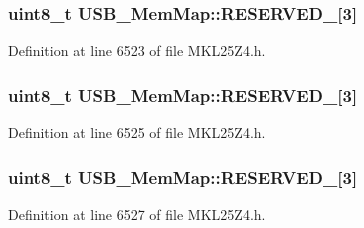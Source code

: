 \subsubsection[{\texorpdfstring{R\+E\+S\+E\+R\+V\+E\+D\+\_\+11}{RESERVED_11}}]{\setlength{\rightskip}{0pt plus 5cm}uint8\+\_\+t U\+S\+B\+\_\+\+Mem\+Map\+::\+R\+E\+S\+E\+R\+V\+E\+D\+\_\mbox{[}3\mbox{]}}\hypertarget{struct_u_s_b___mem_map_a60b8bb28c42b316a1f9bf655e900a39e}{}\label{struct_u_s_b___mem_map_a60b8bb28c42b316a1f9bf655e900a39e}


Definition at line 6523 of file M\+K\+L25\+Z4.\+h.

\subsubsection[{\texorpdfstring{R\+E\+S\+E\+R\+V\+E\+D\+\_\+12}{RESERVED_12}}]{\setlength{\rightskip}{0pt plus 5cm}uint8\+\_\+t U\+S\+B\+\_\+\+Mem\+Map\+::\+R\+E\+S\+E\+R\+V\+E\+D\+\_\mbox{[}3\mbox{]}}\hypertarget{struct_u_s_b___mem_map_a2c373821485abf12490a7676e60615ad}{}\label{struct_u_s_b___mem_map_a2c373821485abf12490a7676e60615ad}


Definition at line 6525 of file M\+K\+L25\+Z4.\+h.

\subsubsection[{\texorpdfstring{R\+E\+S\+E\+R\+V\+E\+D\+\_\+13}{RESERVED_13}}]{\setlength{\rightskip}{0pt plus 5cm}uint8\+\_\+t U\+S\+B\+\_\+\+Mem\+Map\+::\+R\+E\+S\+E\+R\+V\+E\+D\+\_\mbox{[}3\mbox{]}}\hypertarget{struct_u_s_b___mem_map_a927a6a42a1916fc3c31e4c19619f8a7d}{}\label{struct_u_s_b___mem_map_a927a6a42a1916fc3c31e4c19619f8a7d}


Definition at line 6527 of file M\+K\+L25\+Z4.\+h.

